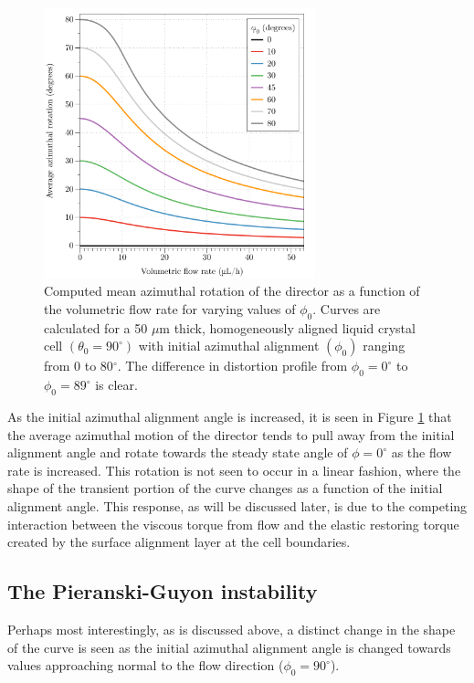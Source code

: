 \begin{figure}
\begin{center}
\includegraphics[width=0.7\textwidth]{Figures/45/vary_phi}
\end{center}
\caption[Average director rotation for varying values of $\phi_0$]{\label{fig:different_phis} Computed mean azimuthal rotation of the director as a function of the volumetric flow rate for varying values of $\phi_0$. Curves are calculated for a 50 $\mu$m thick, homogeneously aligned liquid crystal cell $\left(\theta_0=90^{\circ}\right)$ with initial azimuthal alignment $\left(\phi_0\right)$ ranging from 0 to 80$^{\circ}$. The difference in distortion profile from $\phi_0=0^{\circ}$ to $\phi_0=89^{\circ}$ is clear.}
\end{figure}

As the initial azimuthal alignment angle is increased, it is seen in Figure \ref{fig:different_phis} that the average azimuthal motion of the director tends to pull away from the initial alignment angle and rotate towards the steady state angle of $\phi=0^{\circ}$ as the flow rate is increased. This rotation is not seen to occur in a linear fashion, where the shape of the transient portion of the curve changes as a function of the initial alignment angle. This response, as will be discussed later, is due to the competing interaction between the viscous torque from flow and the elastic restoring torque created by the surface alignment layer at the cell boundaries.

\subsection{The Pieranski-Guyon instability}
\label{pg_instability}
Perhaps most interestingly, as is discussed above, a distinct change in the shape of the curve is seen as the initial azimuthal alignment angle is changed towards values approaching normal to the flow direction ($\phi_0=90^{\circ}$).

